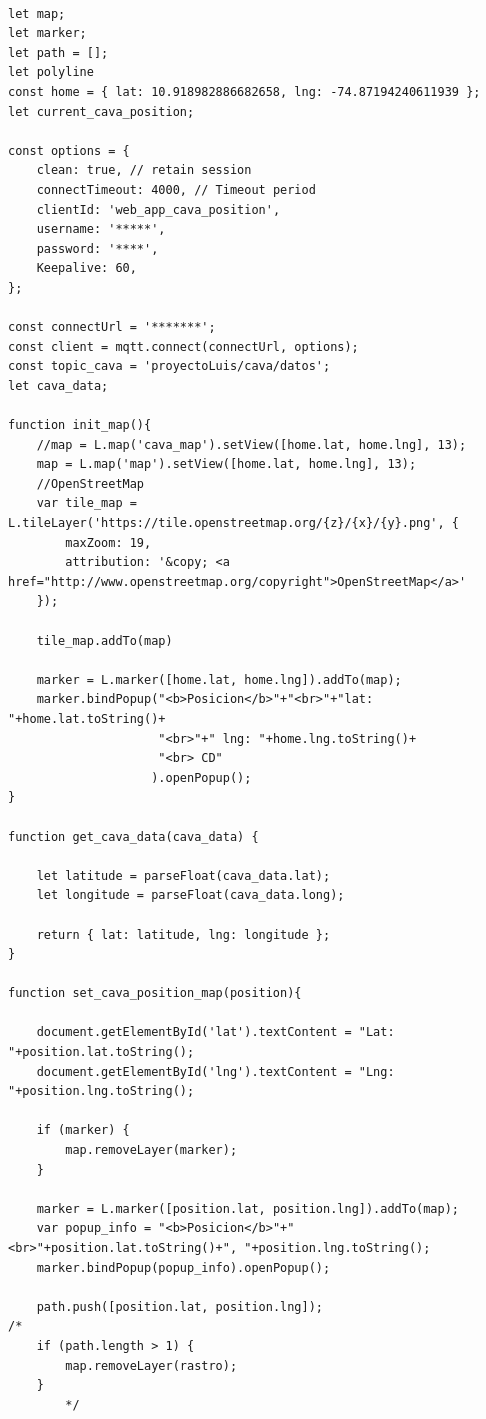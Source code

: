 \begin{lstlisting}[label=cod:aplicacion_web_js, caption=Implementación en javascript de la parte dinámica de la página web.] 

let map;
let marker;
let path = [];
let polyline
const home = { lat: 10.918982886682658, lng: -74.87194240611939 };
let current_cava_position;

const options = {
    clean: true, // retain session
    connectTimeout: 4000, // Timeout period
    clientId: 'web_app_cava_position',
    username: '*****',
    password: '****',
    Keepalive: 60,
};

const connectUrl = '*******';
const client = mqtt.connect(connectUrl, options);
const topic_cava = 'proyectoLuis/cava/datos';
let cava_data;

function init_map(){
    //map = L.map('cava_map').setView([home.lat, home.lng], 13);
    map = L.map('map').setView([home.lat, home.lng], 13);
    //OpenStreetMap 
    var tile_map = L.tileLayer('https://tile.openstreetmap.org/{z}/{x}/{y}.png', {
        maxZoom: 19,
        attribution: '&copy; <a href="http://www.openstreetmap.org/copyright">OpenStreetMap</a>'
    });

    tile_map.addTo(map)

    marker = L.marker([home.lat, home.lng]).addTo(map);
    marker.bindPopup("<b>Posicion</b>"+"<br>"+"lat: "+home.lat.toString()+
                     "<br>"+" lng: "+home.lng.toString()+
                     "<br> CD"
                    ).openPopup();
}

function get_cava_data(cava_data) {

    let latitude = parseFloat(cava_data.lat);
    let longitude = parseFloat(cava_data.long);

    return { lat: latitude, lng: longitude };
}

function set_cava_position_map(position){
    
    document.getElementById('lat').textContent = "Lat: "+position.lat.toString();
    document.getElementById('lng').textContent = "Lng: "+position.lng.toString();
    
    if (marker) {
        map.removeLayer(marker);
    }

    marker = L.marker([position.lat, position.lng]).addTo(map);
    var popup_info = "<b>Posicion</b>"+"<br>"+position.lat.toString()+", "+position.lng.toString();
    marker.bindPopup(popup_info).openPopup();

    path.push([position.lat, position.lng]);
/*
    if (path.length > 1) {
        map.removeLayer(rastro);
    }
        */


\end{lstlisting}
